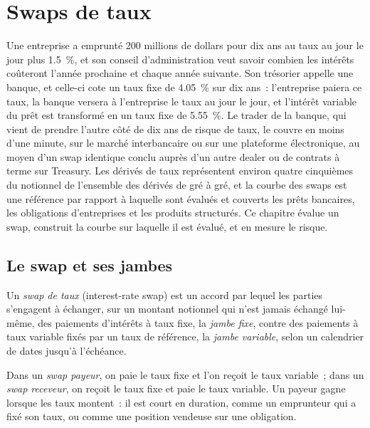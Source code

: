 \chapter{Swaps de taux}\label{ch:m2:interest-rate-swaps}

Une entreprise a emprunté 200 millions de dollars pour dix ans au taux au jour le jour
plus 1.5~\%, et son conseil d'administration veut savoir combien les intérêts coûteront l'année prochaine
et chaque année suivante. Son trésorier appelle une banque, et celle-ci cote un
taux fixe de 4.05~\% sur dix ans~: l'entreprise paiera ce taux, la banque versera
à l'entreprise le taux au jour le jour, et l'intérêt variable du prêt est transformé
en un taux fixe de 5.55~\%. Le trader de la banque, qui vient de prendre l'autre côté
de dix ans de risque de taux, le couvre en moins d'une minute, sur le
marché interbancaire ou sur une plateforme électronique, au moyen d'un swap identique
conclu auprès d'un autre dealer ou de contrats à terme sur Treasury. Les dérivés de taux représentent
environ quatre cinquièmes du notionnel de l'ensemble des dérivés de gré à gré, et la
courbe des swaps est une référence par rapport à laquelle sont évalués et couverts les prêts bancaires, les obligations d'entreprises et
les produits structurés. Ce chapitre
évalue un swap, construit la courbe sur laquelle il est évalué, et en mesure le risque.

\section{Le swap et ses jambes}

\begin{definition}\label{def:m2:interest-rate-swaps:swap}
Un \emph{swap de taux} (interest-rate swap) est un accord par lequel les parties s'engagent à
échanger, sur un montant notionnel qui n'est jamais échangé lui-même, des paiements
d'intérêts à taux fixe, la \emph{jambe fixe}, contre des paiements
à taux variable fixés par un taux de référence, la \emph{jambe variable},
selon un calendrier de dates jusqu'à l'échéance.
\end{definition}

\begin{definition}\label{def:m2:interest-rate-swaps:payer}
Dans un \emph{swap payeur}, on paie le taux fixe et l'on reçoit
le taux variable~; dans un \emph{swap receveur}, on reçoit le taux fixe et
paie le taux variable. Un payeur gagne lorsque les taux montent~: il est court en duration, comme
un emprunteur qui a fixé son taux, ou comme une position vendeuse sur une obligation.
\end{definition}

